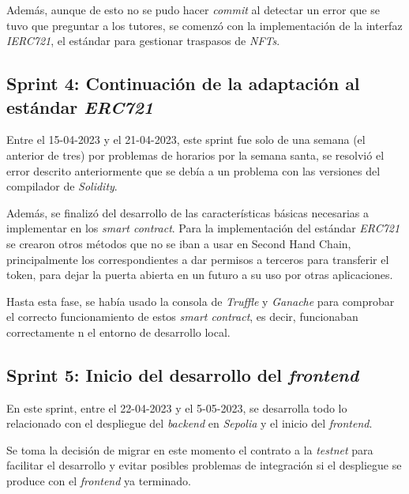 
Además, aunque de esto no se pudo hacer \textit{commit} al detectar un error que se tuvo que preguntar a los tutores, se comenzó con la implementación de la interfaz \textit{IERC721}, el estándar para gestionar traspasos de \textit{NFTs}.

\subsection{Sprint 4: Continuación de la adaptación al estándar \textit{ERC721}}

Entre el 15-04-2023 y el 21-04-2023, este sprint fue solo de una semana (el anterior de tres) por problemas de horarios por la semana santa, se resolvió el error descrito anteriormente que se debía a un problema con las versiones del compilador de \textit{Solidity}.


Además, se finalizó del desarrollo de las características básicas necesarias a implementar en los \textit{smart contract}. Para la implementación del estándar \textit{ERC721} se crearon otros métodos que no se iban a usar en Second Hand Chain, principalmente los correspondientes a dar permisos a terceros para transferir el token, para dejar la puerta abierta en un futuro a su uso por otras aplicaciones.

Hasta esta fase, se había usado la consola de \textit{Truffle} y \textit{Ganache} para comprobar el correcto funcionamiento de estos \textit{smart contract}, es decir, funcionaban correctamente n el entorno de desarrollo local.

\subsection{Sprint 5: Inicio del desarrollo del \textit{frontend}}


En este sprint, entre el 22-04-2023 y el 5-05-2023,  se desarrolla todo lo relacionado con el despliegue del \textit{backend} en \textit{Sepolia} y el inicio del \textit{frontend}.


Se toma la decisión de migrar en este momento el contrato a la \textit{testnet} para facilitar el desarrollo y evitar posibles problemas de integración si el despliegue se produce con el \textit{frontend} ya terminado.


